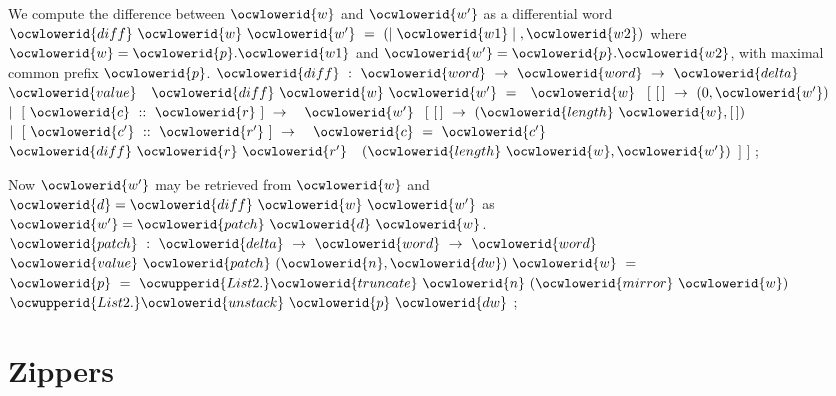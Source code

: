 \documentclass[12pt]{article}
\begin{document}
\ocwendcode{}\ocwindent{0.00em}
We compute the difference between \ocwbegindcode{}$\ocwlowerid{w}$\ocwenddcode{} and \ocwbegindcode{}$\ocwlowerid{w'}$\ocwenddcode{} as a differential word 
   \ocwbegindcode{}$\ocwlowerid{diff}~\ocwlowerid{w}~\ocwlowerid{w'}~=~(\mid{}\ocwlowerid{w1}\mid{},\ocwlowerid{w2})$\ocwenddcode{} where \ocwbegindcode{}$\ocwlowerid{w}=\ocwlowerid{p}.\ocwlowerid{w1}$\ocwenddcode{} and \ocwbegindcode{}$\ocwlowerid{w'}=\ocwlowerid{p}.\ocwlowerid{w2}$\ocwenddcode{}, 
   with maximal common prefix \ocwbegindcode{}$\ocwlowerid{p}$\ocwenddcode{}.                                      
\ocweol
\ocwindent{0.00em}
\ocwbegindcode{}$\ocwlowerid{diff}~:~\ocwlowerid{word}~\rightarrow{}~\ocwlowerid{word}~\rightarrow{}~\ocwlowerid{delta}$\ocwenddcode{}                                       
\ocweol
\label{../ML/word.ml:3452}%
\medskip
\ocwbegincode{}\ocwindent{0.00em}
$\ocwlowerid{value}~$~$\ocwlowerid{diff}~\ocwlowerid{w}~\ocwlowerid{w'}~=~$~$\ocwlowerid{w}~$\ocweol
\ocwindent{1.00em}
$[~[\,]~\rightarrow{}~(0,\ocwlowerid{w'})$\ocweol
\ocwindent{1.00em}
$\mid{}~[~\ocwlowerid{c}~::~\ocwlowerid{r}~]~\rightarrow{}~$~$\ocwlowerid{w'}~$\ocweol
\ocwindent{3.00em}
$[~[\,]~\rightarrow{}~(\ocwlowerid{length}~\ocwlowerid{w},[\,])$\ocweol
\ocwindent{3.00em}
$\mid{}~[~\ocwlowerid{c'}~::~\ocwlowerid{r'}~]~\rightarrow{}~$~$\ocwlowerid{c}~=~\ocwlowerid{c'}~$~$\ocwlowerid{diff}~\ocwlowerid{r}~\ocwlowerid{r'}$\ocweol
\ocwindent{12.00em}
~$(\ocwlowerid{length}~\ocwlowerid{w},\ocwlowerid{w'})$\ocweol
\ocwindent{3.00em}
$]$\ocweol
\ocwindent{1.00em}
$]$\ocweol
\ocwindent{0.00em}
;\medskip

\ocwendcode{}\ocwindent{0.00em}
Now \ocwbegindcode{}$\ocwlowerid{w'}$\ocwenddcode{} may be retrieved from \ocwbegindcode{}$\ocwlowerid{w}$\ocwenddcode{} and \ocwbegindcode{}$\ocwlowerid{d}=\ocwlowerid{diff}~\ocwlowerid{w}~\ocwlowerid{w'}$\ocwenddcode{} as \ocwbegindcode{}$\ocwlowerid{w'}=\ocwlowerid{patch}~\ocwlowerid{d}~\ocwlowerid{w}$\ocwenddcode{}. 
\ocweol
\ocwindent{0.00em}
\ocwbegindcode{}$\ocwlowerid{patch}~:~\ocwlowerid{delta}~\rightarrow{}~\ocwlowerid{word}~\rightarrow{}~\ocwlowerid{word}$\ocwenddcode{}                                         
\ocweol
\label{../ML/word.ml:3828}%
\medskip
\ocwbegincode{}\ocwindent{0.00em}
$\ocwlowerid{value}~\ocwlowerid{patch}~(\ocwlowerid{n},\ocwlowerid{dw})~\ocwlowerid{w}~=~$\ocweol
\ocwindent{1.00em}
~$\ocwlowerid{p}~=~\ocwupperid{List2.}\ocwlowerid{truncate}~\ocwlowerid{n}~(\ocwlowerid{mirror}~\ocwlowerid{w})~$\ocweol
\ocwindent{1.00em}
$\ocwupperid{List2.}\ocwlowerid{unstack}~\ocwlowerid{p}~\ocwlowerid{dw}$\ocweol
\ocwindent{0.00em}
;\ocweol
\ocweol
\ocwendcode{}\section{Zippers}
\end{document}
